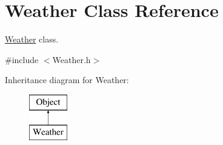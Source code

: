 \hypertarget{classWeather}{\section{Weather Class Reference}
\label{classWeather}
}


\hyperlink{classWeather}{Weather} class.  




{\ttfamily \#include $<$Weather.\-h$>$}

Inheritance diagram for Weather\-:\begin{figure}[H]
\begin{center}
\leavevmode
\includegraphics[height=2.000000cm]{classWeather}
\end{center}
\end{figure}
